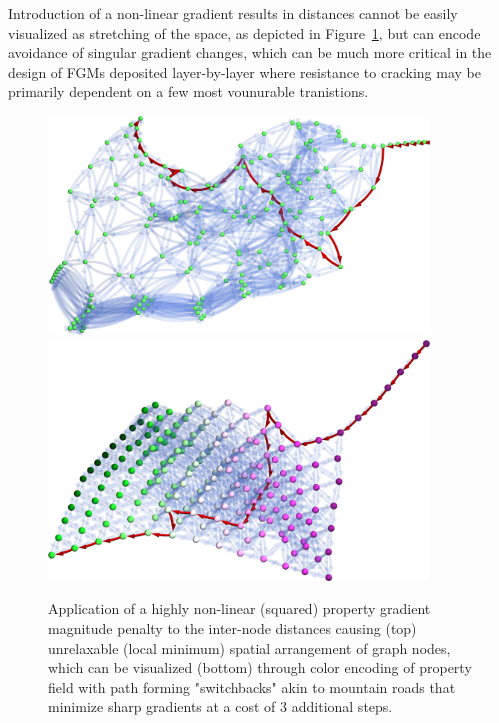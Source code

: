 Introduction of a non-linear gradient results in distances cannot be easily visualized as stretching of the space, as depicted in Figure~\ref{pathplan:fig:lowgradientsquared}, but can encode avoidance of singular gradient changes, which can be much more critical in the design of FGMs deposited layer-by-layer where resistance to cracking may be primarily dependent on a few most vounurable tranistions.

\begin{figure}[H]
    \centering
    \includegraphics[width=0.9\textwidth]{pathplanning/InfeasibilityGliding_LowGradientSquared.png}
    \includegraphics[width=0.9\textwidth]{pathplanning/InfeasibilityGliding_LowGradientSquaredColored.png}
    \caption{Application of a highly non-linear (squared) property gradient magnitude penalty to the inter-node distances causing (top) unrelaxable (local minimum) spatial arrangement of graph nodes, which can be visualized (bottom) through color encoding of property field with path forming "switchbacks" akin to mountain roads that minimize sharp gradients at a cost of 3 additional steps.}
    \label{pathplan:fig:lowgradientsquared}
\end{figure}

